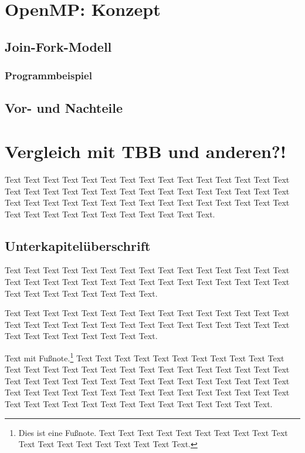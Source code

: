 \documentclass{lni}
\begin{document}
\section{OpenMP: Konzept}

\subsection{Join-Fork-Modell}
\subsubsection{Programmbeispiel}
\subsection{Vor- und Nachteile}

\section{Vergleich mit TBB und anderen?!}

Text Text Text Text Text Text Text Text Text Text Text Text Text Text Text Text Text Text Text Text Text Text Text Text Text Text Text Text Text Text Text Text Text Text Text Text Text Text Text Text Text Text Text Text Text Text Text Text Text Text Text Text Text Text Text Text.

\subsection{Unterkapitelüberschrift}

Text Text Text Text Text Text Text Text Text Text Text Text Text Text Text Text Text Text Text Text Text Text Text Text Text Text Text Text Text Text Text Text Text Text Text Text Text Text.


Text Text Text Text Text Text Text Text Text Text Text Text Text Text Text Text Text Text Text Text Text Text Text Text Text Text Text Text Text Text Text Text Text Text Text Text Text Text.

Text mit Fußnote.\footnote{Dies ist eine Fußnote. Text Text Text Text Text Text Text Text Text Text Text Text Text Text Text Text Text Text Text.} Text \cite{Ez99,ABC01} Text Text Text Text Text Text Text Text Text Text Text Text Text Text Text Text Text Text Text Text Text Text Text Text Text Text Text Text  Text Text Text Text Text Text Text Text Text Text Text Text Text Text Text Text Text Text Text Text Text Text Text Text Text Text Text Text Text Text Text Text Text Text Text Text Text Text Text Text Text.
\end{document}
